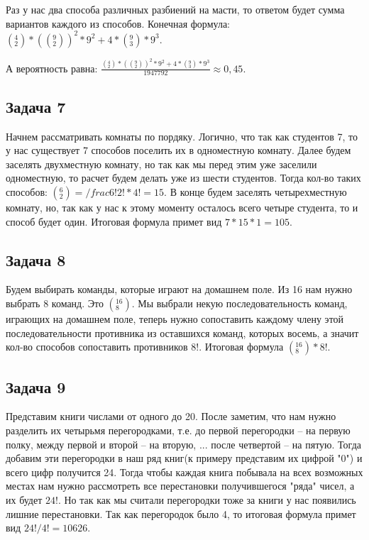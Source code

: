 	Раз у нас два способа различных разбиений на масти, то ответом будет сумма вариантов каждого из способов. 
	Конечная формула: $\left(_{2}^{4}\right) * (\left(_{2}^{9}\right))^2*9^2 + 4 * \left(_{3}^{9}\right) * 9^3$.
	
	А вероятность равна: $\frac{\left(_{2}^{4}\right) * (\left(_{2}^{9}\right))^2*9^2 + 4 * \left(_{3}^{9}\right) * 9^3}{1947792} \approx 0,45$.
	
	
	\subsection{Задача 7}
	Начнем рассматривать комнаты по пордяку. Логично, что так как студентов 7, то у нас существует 7 способов поселить их в одноместную комнату. Далее будем заселять двухместную комнату, но так как мы перед этим уже заселили одноместную, то расчет будем делать уже из шести студентов. Тогда кол-во таких способов: $\left(_{2}^{6}\right) = /frac{6!}{2!*4!} = 15$. В конце будем заселять четырехместную комнату, но, так как у нас к этому моменту осталось всего четыре студента, то и способ будет один. 
	Итоговая формула примет вид $7 * 15 * 1 = 105$.\underline{}

	\subsection{Задача 8}
	Будем выбирать команды, которые играют на домашнем поле. Из 16 нам нужно выбрать 8 команд. Это $\left(_{8}^{16}\right)$. Мы выбрали некую последовательность  команд, играющих на домашнем поле, теперь нужно сопоставить каждому члену этой последовательности противника из оставшихся команд, которых восемь, а значит кол-во способов сопоставить противников $8!$.
	Итоговая формула $\left(_{8}^{16}\right) * 8!$.
	
	\subsection{Задача 9}
	Представим книги числами от одного до 20. После заметим, что нам нужно разделить их четырьмя перегородками, т.е. до первой перегородки -- на первую полку, между первой и второй -- на вторую, ... после четвертой -- на пятую. Тогда добавим эти перегородки в наш ряд  книг(к примеру представим их цифрой "0") и всего цифр получится 24. 
	Тогда чтобы каждая книга побывала на всех возможных местах нам нужно рассмотреть все перестановки получившегося "ряда" чисел, а их будет $24!$.  Но так как мы считали перегородки  тоже за книги у нас появились лишние перестановки. Так как перегородок  было 4, то итоговая формула примет вид $24! / 4! = 10626$.

	